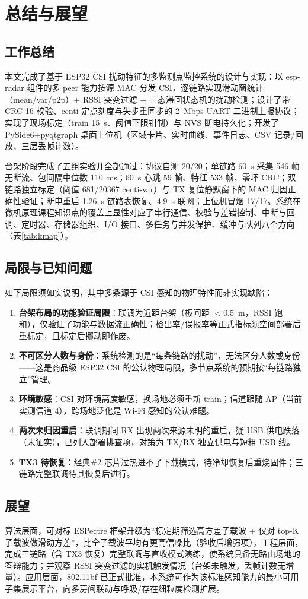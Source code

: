 \chapter{总结与展望}\label{chap:concl}

\section{工作总结}

本文完成了基于 ESP32 CSI 扰动特征的多监测点监控系统的设计与实现：以 esp-radar 组件的多 peer 能力按源 MAC 分发 CSI，逐链路实现滑动窗统计（mean/var/p2p）+ RSSI 突变过滤 + 三态滞回状态机的扰动检测；设计了带 CRC-16 校验、centi 定点刻度与失步重同步的 2~Mbps UART 二进制上报协议；实现了现场标定（train 15~s、阈值下限钳制）与 NVS 断电持久化；开发了 PySide6+pyqtgraph 桌面上位机（区域卡片、实时曲线、事件日志、CSV 记录/回放、三层丢帧计数）。

台架阶段完成了五组实验并全部通过：协议自测 20/20；单链路 60~s 采集 546 帧无断流、包间隔中位数 110~ms；60~s 心跳 59 帧、特征 533 帧、零坏 CRC；双链路独立标定（阈值 681/20367 centi-var）与 TX 复位静默窗下的 MAC 归因正确性验证；断电重启 1.26~s 链路表恢复、4.9~s 联网；上位机冒烟 17/17。系统在微机原理课程知识点的覆盖上显性对应了串行通信、校验与差错控制、中断与回调、定时器、存储器组织、I/O 接口、多任务与并发保护、缓冲与队列八个方向（表\ref{tab:kmap}）。

\section{局限与已知问题}

如下局限须如实说明，其中多条源于 CSI 感知的物理特性而非实现缺陷：

\begin{enumerate}
  \item \textbf{台架布局的功能验证局限}：联调为近距台架（板间距 $<$0.5~m，RSSI 饱和），仅验证了功能与数据流正确性；检出率/误报率等正式指标须空间部署后重标定，且标定后挪动即作废。
  \item \textbf{不可区分人数与身份}：系统检测的是“每条链路的扰动”，无法区分人数或身份——这是商品级 ESP32 CSI 的公认物理局限\cite{ref:gait}，多节点系统的预期按“每链路独立”管理。
  \item \textbf{环境敏感}：CSI 对环境高度敏感，换场地必须重新 train；信道跟随 AP（当前实测信道 4），跨场地泛化是 Wi-Fi 感知的公认难题\cite{ref:generalizability}。
  \item \textbf{两次未归因重启}：联调期间 RX 出现两次来源未明的重启，疑 USB 供电跌落（未证实），已列入部署排查项，对策为 TX/RX 独立供电与短粗 USB 线。
  \item \textbf{TX3 待恢复}：经典\#2 芯片过热进不了下载模式，待冷却恢复后重烧固件；三链路完整联调待其恢复后进行。
\end{enumerate}

\section{展望}

算法层面，可对标 ESPectre 框架升级为“标定期筛选高方差子载波 + 仅对 top-K 子载波做滑动方差”，比全子载波平均有更高信噪比\cite{ref:espectre}（验收后增强项）。工程层面，完成三链路（含 TX3 恢复）完整联调与直收模式演练，使系统具备无路由场地的答辩能力；并观察 RSSI 突变过滤的实机触发情况（台架未触发，丢帧计数无增量）。应用层面，802.11bf 已正式批准\cite{ref:80211bf}，本系统可作为该标准感知能力的最小可用子集展示平台，向多房间联动与呼吸/存在细粒度检测扩展。
